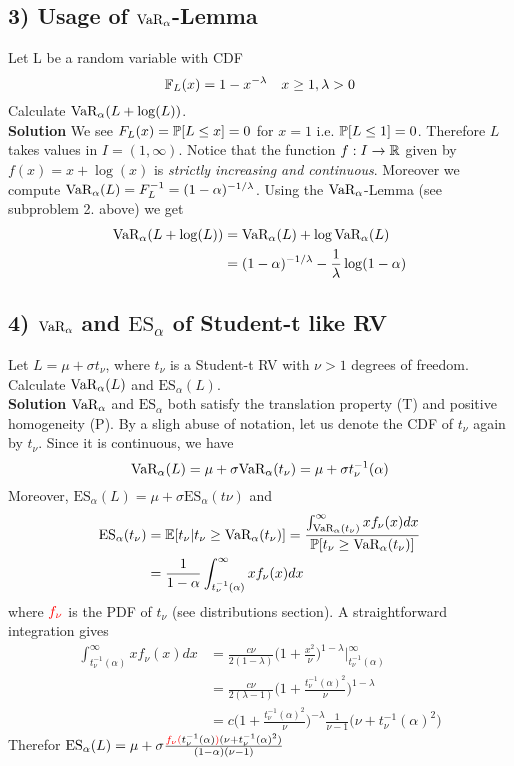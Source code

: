 %
%
\subsection*{3) Usage of $\text{VaR}_\alpha$-Lemma}
Let L be a random variable with CDF
\[
    \mathbb{F}_L(x) = 1 - x^{-\lambda} \quad x \geq 1, \lambda > 0
\]
Calculate $\text{VaR}_\alpha(L + \log(L))$. \\
\textbf{Solution} We see $F_L(x) = \mathbb{P}[L \leq x] = 0$ for $x=1$ i.e. $\mathbb{P}[L \leq 1] = 0$. Therefore $L$ takes values in $I = (1, \infty)$. Notice that the function $f : I \to \mathbb{R}$ given by $f(x) = x + \log(x)$ is \textit{strictly increasing and continuous}. Moreover we compute $\text{VaR}_\alpha(L) = F_L^{-1} = (1 - \alpha)^{-1/\lambda}$. Using the $\text{VaR}_\alpha$-Lemma (see subproblem 2. above) we get
\begin{align*}
    \text{VaR}_\alpha(L + \log(L)) &= \text{VaR}_\alpha(L) + \log \text{VaR}_\alpha(L) \\
    &= (1 - \alpha)^{-1/\lambda} - \frac{1}{\lambda}\log( 1 - \alpha )
\end{align*}

%
%
\subsection*{4) $\text{VaR}_\alpha$ and $\text{ES}_\alpha$ of Student-t like RV}
Let $L = \mu + \sigma t_\nu$, where $t_\nu$ is a Student-t RV with $\nu>1$ degrees of freedom. Calculate $\text{VaR}_\alpha(L)$ and $\text{ES}_\alpha(L)$. \\
\textbf{Solution} $\text{VaR}_\alpha$ and $\text{ES}_\alpha$ both satisfy the translation property (T) and positive homogeneity (P). By a sligh abuse of notation, let us denote the CDF of $t_\nu$ again by $t_\nu$. Since it is continuous, we have
\[
    \text{VaR}_\alpha(L) = \mu + \sigma\text{VaR}_\alpha(t_\nu) = \mu + \sigma t_\nu^{-1}(\alpha)
\]
Moreover, $\text{ES}_\alpha(L) = \mu + \sigma\text{ES}_\alpha(t\nu)$ and
\begin{align*}
    \text{ES}_\alpha(t_\nu) 
    &= \mathbb{E}[t_\nu | t_\nu \geq \text{VaR}_\alpha(t_\nu)]
    = \frac{\int_{\text{VaR}_\alpha(t_\nu)}^\infty x f_\nu(x) dx}{\mathbb{P}[t_\nu \geq \text{VaR}_\alpha(t_\nu)]} \\
    &= \frac{1}{1 - \alpha} \int_{t^{-1}_\nu(\alpha)}^\infty x f_\nu(x) dx
\end{align*}
where $\textcolor{red}{f_\nu}$ is the PDF of $t_\nu$ (see distributions section).
A straightforward integration gives
\begin{align*}
    \int_{t^{-1}_\nu(\alpha)}^\infty x f_\nu(x) dx &= \frac{c\nu}{2(1 - \lambda)}
    \bigg(1 + \frac{x^2}{\nu}\bigg)^{1-\lambda}\bigg|_{t_\nu^{-1}(\alpha)}^\infty \\
    &= \frac{c\nu}{2(\lambda - 1)}\bigg(1 + \frac{t_\nu^{-1}(\alpha)^2}{\nu}\bigg)^{1-\lambda} \\
    &= c\bigg(1 + \frac{t_\nu^{-1}(\alpha)^2}{\nu}\bigg)^{-\lambda}\frac{1}{\nu-1}
    \big(\nu + t^{-1}_{\nu}(\alpha)^2\big)
\end{align*}
Therefor $\text{ES}_\alpha(L) = \mu + \sigma\frac{\textcolor{red}{f_\nu(} t^{-1}_\nu(\alpha)\textcolor{red}{)}(\nu + t^{-1}_\nu(\alpha)^2)}{(1-\alpha)(\nu - 1)}$

